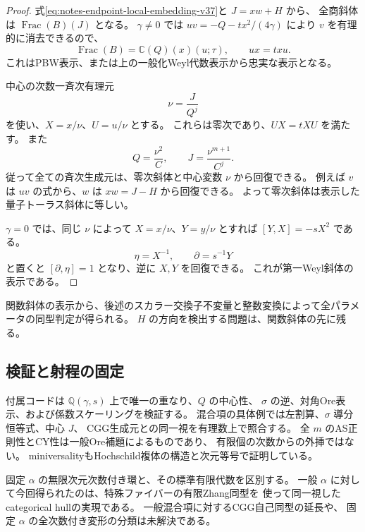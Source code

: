 \begin{proof}
式\eqref{eq:notes-endpoint-local-embedding-v37}と $J=xw+H$ から、
全商斜体は $\operatorname{Frac}(B)(J)$ となる。
$\gamma\ne0$ では
$uv=-Q-tx^2/(4\gamma)$ により $v$ を有理的に消去できるので、
\[
 \operatorname{Frac}(B)=\mathbb C(Q)(x)(u;\tau),\qquad ux=txu.
\]
これはPBW表示、または上の一般化Weyl代数表示から忠実な表示となる。

中心の次数一斉次有理元
\[
 \nu=\frac{J}{Q^j}
\]
を使い、$X=x/\nu$、$U=u/\nu$ とする。
これらは零次であり、$UX=tXU$ を満たす。
また
\[
 Q=\frac{\nu^2}{C},\qquad J=\frac{\nu^{m+1}}{C^j}.
\]
従って全ての斉次生成元は、零次斜体と中心変数 $\nu$ から回復できる。
例えば $v$ は $uv$ の式から、$w$ は $xw=J-H$ から回復できる。
よって零次斜体は表示した量子トーラス斜体に等しい。

$\gamma=0$ では、同じ $\nu$ によって
$X=x/\nu$、$Y=y/\nu$ とすれば
$[Y,X]=-sX^2$ である。
\[
 \eta=X^{-1},\qquad \partial=s^{-1}Y
\]
と置くと $[\partial,\eta]=1$ となり、逆に $X,Y$ を回復できる。
これが第一Weyl斜体の表示である。
\end{proof}


関数斜体の表示から、後述のスカラー交換子不変量と整数変換によって全パラメータの同型判定が得られる。
$H$ の方向を検出する問題は、関数斜体の先に残る。

\subsection{検証と射程の固定}

付属コードは $\mathbb Q(\gamma,s)$ 上で唯一の重なり、$Q$ の中心性、
$\sigma$ の逆、対角Ore表示、および係数スケーリングを検証する。
混合項の具体例では左割算、$\sigma$ 導分恒等式、中心 $J$、
CGG生成元との同一視を有理数上で照合する。
全 $m$ のAS正則性とCY性は一般Ore補題によるものであり、
有限個の次数からの外挿ではない。
miniversalityもHochschild複体の構造と次元等号で証明している。

固定 $\alpha$ の無限次元次数付き環と、その標準有限代数を区別する。
一般 $\alpha$ に対して今回得られたのは、特殊ファイバーの有限Zhang同型を
使って同一視したcategorical hullの実現である。
一般混合項に対するCGG自己同型の延長や、
固定 $\alpha$ の全次数付き変形の分類は未解決である。
